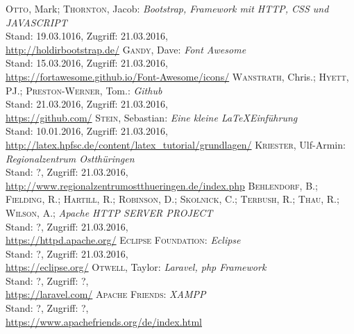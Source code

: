 

\begin{thebibliography}{999}

 \textsc{Otto}, Mark; \textsc{Thornton}, Jacob: \textit{Bootstrap, Framework mit HTTP, CSS und JAVASCRIPT}\\
			{\small Stand: 19.03.1016, Zugriff: 21.03.2016,}\\
			\url{http://holdirbootstrap.de/}
 \textsc{Gandy}, Dave: \textit{Font Awesome}\\
			{\small Stand: 15.03.2016, Zugriff: 21.03.2016,} \\
			\url{https://fortawesome.github.io/Font-Awesome/icons/}
 \textsc{Wanstrath}, Chris.; \textsc{Hyett}, PJ.; \textsc{Preston-Werner}, Tom.:  \textit{Github}\\ 
			{\small Stand: 21.03.2016, Zugriff: 21.03.2016,}\\ 			
			\url{https://github.com/}
 \textsc{Stein}, Sebastian: \textit{Eine kleine \LaTeX Einführung}\\
			{\small Stand: 10.01.2016, Zugriff: 21.03.2016,} \\
			\url{http://latex.hpfsc.de/content/latex_tutorial/grundlagen/}
 \textsc{Kriester}, Ulf-Armin: \textit{Regionalzentrum Ostthüringen}\\
			{\small Stand: ?, Zugriff: 21.03.2016,} \\
			\url{http://www.regionalzentrumostthueringen.de/index.php}
 \textsc{Behlendorf}, B.; \textsc{Fielding}, R.; \textsc{Hartill}, R.; \textsc{Robinson}, D.; \textsc{Skolnick}, C.; \textsc{Terbush}, R.; \textsc{Thau}, R.; \textsc{Wilson}, A.; \textit{Apache HTTP SERVER PROJECT}\\
			{\small Stand: ?, Zugriff: 21.03.2016,} \\
			\url{https://httpd.apache.org/}
 \textsc{Eclipse Foundation}: \textit{Eclipse}\\
			{\small Stand: ?, Zugriff: 21.03.2016,} \\
			\url{https://eclipse.org/}
 \textsc{Otwell}, Taylor: \textit{Laravel, php Framework}\\
			{\small Stand: ?, Zugriff: ?,} \\
			\url{https://laravel.com/}
 \textsc{Apache Friends}: \textit{XAMPP}\\
			{\small Stand: ?, Zugriff: ?,} \\
			\url{https://www.apachefriends.org/de/index.html}		
			
			
\end{thebibliography}
